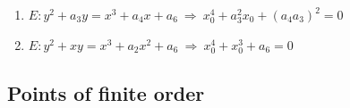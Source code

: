 \documentclass[10pt,handout]{beamer} %
\begin{document}
\begin{frame}
\begin{exercise}
\begin{enumerate}[<+-| alert@+>]
  \item $E: y^2+a_3y=x^3+a_4x+a_6\ \Rightarrow\ x_0^4+a_3^2x_0+(a_4a_3)^2=0$
  \item $E: y^2+xy=x^3+a_2x^2+a_6\ \Rightarrow\ x_0^4+x_0^3+a_6=0$
\end{enumerate}
\end{exercise}


\end{frame}

\subsection{Points of finite order}
\end{document}
